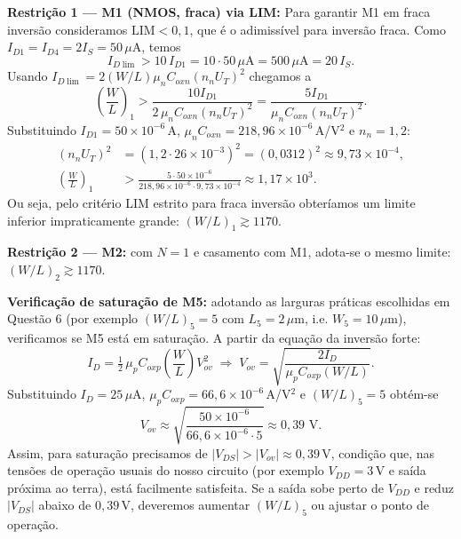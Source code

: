 ﻿\documentclass[12pt,a4paper]{article}
\begin{document}
    	\textbf{Restrição 1 — M1 (NMOS, fraca) via LIM:}
Para garantir M1 em fraca inversão consideramos $\mathrm{LIM}<0{,}1$, que é o adimissível para inversão fraca. Como $I_{D1}=I_{D4}=2I_S=50\,\mu$A, temos
\begin{equation*}
I_{D\lim} > 10\,I_{D1} = 10\cdot 50\,\mu\text{A} = 500\,\mu\text{A} = 20\,I_S.
\end{equation*}
Usando $I_{D\lim}=2(W/L)\mu_n C_{ox n}(n_n U_T)^2$ chegamos a
\begin{equation*}
\left(\frac{W}{L}\right)_1 > \frac{10 I_{D1}}{2\,\mu_n C_{ox n}(n_n U_T)^2} = \frac{5 I_{D1}}{\mu_n C_{ox n}(n_n U_T)^2}.
\end{equation*}
Substituindo $I_{D1}=50\times10^{-6}\,$A, $\mu_n C_{ox n}=218{,}96\times10^{-6}\,$A/V$^2$ e $n_n=1{,}2$:
\begin{align*}
(n_n U_T)^2 &= (1{,}2\cdot26\times10^{-3})^2=(0{,}0312)^2\approx 9{,}73\times10^{-4},\\
\left(\frac{W}{L}\right)_1 &> \frac{5\cdot 50\times10^{-6}}{218{,}96\times10^{-6}\cdot 9{,}73\times10^{-4}} \approx \boxed{1{,}17\times10^{3}}.
\end{align*}
Ou seja, pelo critério LIM estrito para fraca inversão obteríamos um limite inferior impraticamente grande: $(W/L)_1\gtrsim 1170$.

    	\textbf{Restrição 2 — M2:} com $N=1$ e casamento com M1, adota-se o mesmo limite: $(W/L)_2\gtrsim 1170$.

    	\textbf{Verificação de saturação de M5:} adotando as larguras práticas escolhidas em Questão 6 (por exemplo $(W/L)_5=5$ com $L_5=2\,\mu$m, i.e. $W_5=10\,\mu$m), verificamos se M5 está em saturação. A partir da equação da inversão forte:
\begin{equation}
I_D = \tfrac{1}{2}\,\mu_p C_{ox p}\left(\frac{W}{L}\right)V_{ov}^2 \;\Longrightarrow\; V_{ov} = \sqrt{\frac{2I_D}{\mu_p C_{ox p}(W/L)}}.
\end{equation}
Substituindo $I_D=25\,\mu$A, $\mu_p C_{ox p}=66{,}6\times10^{-6}\,$A/V$^2$ e $(W/L)_5=5$ obtém-se
\begin{equation}
V_{ov}\approx\sqrt{\frac{50\times10^{-6}}{66{,}6\times10^{-6}\cdot 5}}\approx 0{,}39\text{ V}.
\end{equation}
Assim, para saturação precisamos de $|V_{DS}|>|V_{ov}|\approx 0{,}39\,$V, condição que, nas tensões de operação usuais do nosso circuito (por exemplo $V_{DD}=3\,$V e saída próxima ao terra), está facilmente satisfeita. Se a saída sobe perto de $V_{DD}$ e reduz $|V_{DS}|$ abaixo de $0{,}39\,$V, deveremos aumentar $(W/L)_5$ ou ajustar o ponto de operação.
\end{document}
